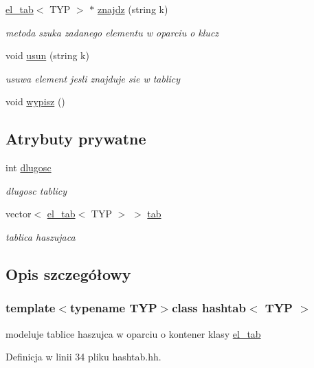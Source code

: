 \begin{DoxyCompactItemize}
\hyperlink{classel__tab}{el\-\_\-tab}$<$ T\-Y\-P $>$ $\ast$ \hyperlink{classhashtab_af6452a7dbb4a30870ec16635b859f18c}{znajdz} (string k)
\begin{DoxyCompactList}\small\item\em metoda szuka zadanego elementu w oparciu o klucz \end{DoxyCompactList}\item 
void \hyperlink{classhashtab_a2c0b494972d78d893a6db6c08b8af3a2}{usun} (string k)
\begin{DoxyCompactList}\small\item\em usuwa element jesli znajduje sie w tablicy \end{DoxyCompactList}\item 
void \hyperlink{classhashtab_a69b5dcc5943caf7afb74a98f461a1c1b}{wypisz} ()
\end{DoxyCompactItemize}
\subsection*{Atrybuty prywatne}
\begin{DoxyCompactItemize}
\item 
int \hyperlink{classhashtab_a1c0fe6f05d425274c58352e21cc7f496}{dlugosc}
\begin{DoxyCompactList}\small\item\em dlugosc tablicy \end{DoxyCompactList}\item 
vector$<$ \hyperlink{classel__tab}{el\-\_\-tab}$<$ T\-Y\-P $>$ $>$ \hyperlink{classhashtab_ab7d4d7c920e89fae8a292772dc9d7611}{tab}
\begin{DoxyCompactList}\small\item\em tablica haszujaca \end{DoxyCompactList}\end{DoxyCompactItemize}


\subsection{Opis szczegółowy}
\subsubsection*{template$<$typename T\-Y\-P$>$class hashtab$<$ T\-Y\-P $>$}

modeluje tablice haszujca w oparciu o kontener klasy \hyperlink{classel__tab}{el\-\_\-tab} 

Definicja w linii 34 pliku hashtab.\-hh.



